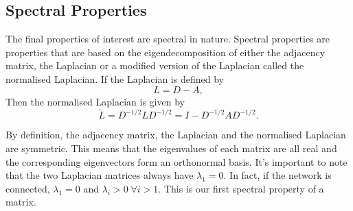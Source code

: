 \subsection{Spectral Properties}
The final properties of interest are spectral in nature. Spectral properties are properties that are based on the eigendecomposition of either the adjacency matrix, the Laplacian or a modified version of the Laplacian called the normalised Laplacian. If the Laplacian is defined by
$$ L = D - A, $$
Then the normalised Laplacian is given by 
$$ \tilde L = D^{-1/2}LD^{-1/2} = I - D^{-1/2}AD^{-1/2}. $$

By definition, the adjacency matrix, the Laplacian and the normalised Laplacian are symmetric. This means that the eigenvalues of each matrix are all real and the corresponding eigenvectors form an orthonormal basis. It's important to note that the two Laplacian matrices always have $\lambda_1 = 0$. In fact, if the network is connected, $\lambda_1 = 0$ and $\lambda_i > 0 \; \forall i > 1$. This is our first spectral property of a matrix.
